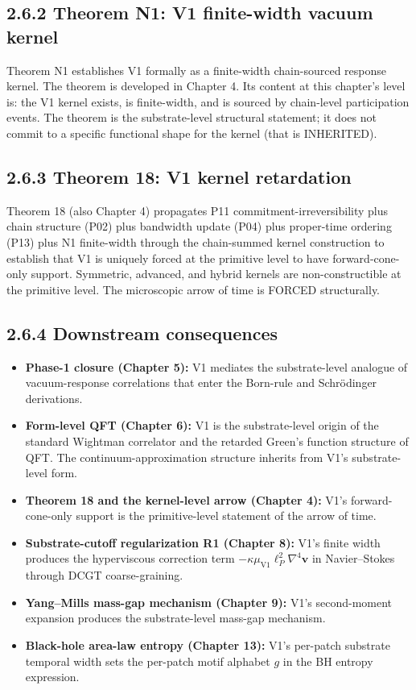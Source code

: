 \documentclass[11pt]{book}
\begin{document}
\subsection{2.6.2 Theorem N1: V1 finite-width vacuum kernel}

Theorem N1 establishes V1 formally as a finite-width chain-sourced response kernel. The theorem is developed in Chapter 4. Its content at this chapter's level is: the V1 kernel exists, is finite-width, and is sourced by chain-level participation events. The theorem is the substrate-level structural statement; it does not commit to a specific functional shape for the kernel (that is INHERITED).

\subsection{2.6.3 Theorem 18: V1 kernel retardation}

Theorem 18 (also Chapter 4) propagates P11 commitment-irreversibility plus chain structure (P02) plus bandwidth update (P04) plus proper-time ordering (P13) plus N1 finite-width through the chain-summed kernel construction to establish that V1 is uniquely forced at the primitive level to have forward-cone-only support. Symmetric, advanced, and hybrid kernels are non-constructible at the primitive level. The microscopic arrow of time is FORCED structurally.

\subsection{2.6.4 Downstream consequences}

\begin{itemize}
\item \textbf{Phase-1 closure (Chapter 5):} V1 mediates the substrate-level analogue of vacuum-response correlations that enter the Born-rule and Schrödinger derivations.
\item \textbf{Form-level QFT (Chapter 6):} V1 is the substrate-level origin of the standard Wightman correlator and the retarded Green's function structure of QFT. The continuum-approximation structure inherits from V1's substrate-level form.
\item \textbf{Theorem 18 and the kernel-level arrow (Chapter 4):} V1's forward-cone-only support is the primitive-level statement of the arrow of time.
\item \textbf{Substrate-cutoff regularization R1 (Chapter 8):} V1's finite width produces the hyperviscous correction term $-\kappa\mu_\mathrm{V1}\ell_P^2 \nabla^4\mathbf{v}$ in Navier–Stokes through DCGT coarse-graining.
\item \textbf{Yang–Mills mass-gap mechanism (Chapter 9):} V1's second-moment expansion produces the substrate-level mass-gap mechanism.
\item \textbf{Black-hole area-law entropy (Chapter 13):} V1's per-patch substrate temporal width sets the per-patch motif alphabet $g$ in the BH entropy expression.
\end{itemize}
\end{document}
